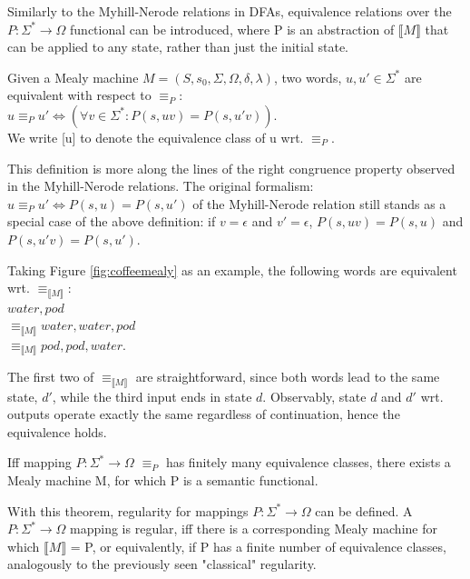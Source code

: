 Similarly to the Myhill-Nerode relations in DFAs, equivalence relations over the $P: \Sigma^*\to\Omega$ functional can be introduced, where P is an abstraction of  $\llbracket M\rrbracket$ that can be applied to any state, rather than just the initial state.

\begin{definition}
	Given a Mealy machine $M=(S,s_{0},\Sigma,\Omega,\delta,\lambda) $, two words, $u, u'\in\Sigma^*$ are equivalent with respect to $\equiv_P$:\\
	$u \equiv_P u' \iff (\forall v\in\Sigma^*:P(s, uv) = P(s, u'v))$.\\
	We write [u] to denote the equivalence class of u wrt. $\equiv_P$.
\end{definition}

This definition is more along the lines of the right congruence property observed in the Myhill-Nerode relations. The original formalism: $u \equiv_P u' \iff P(s, u) = P(s, u')$ of the Myhill-Nerode relation still stands as a special case of the above definition: if $v=\epsilon$ and $v'=\epsilon$, $P(s, uv) = P(s, u)$ and $P(s, u'v) = P(s, u')$.

\begin{example}
	Taking Figure \ref{fig:coffeemealy} as an example, the following words are equivalent wrt. $\equiv_{\llbracket M\rrbracket}$:\\
	\null\qquad\qquad\qquad\qquad\space $water, pod$\\
	\null\qquad\qquad$\equiv_{\llbracket M\rrbracket}$\qquad $water, water, pod$\\
	\null\qquad\qquad$\equiv_{\llbracket M\rrbracket}$\qquad $pod, pod, water$.
	
	The first two of $\equiv_{\llbracket M\rrbracket}$ are straightforward, since both words lead to the same state, $d'$, while the third input ends in state $d$. Observably, state $d$ and $d'$ wrt. outputs operate exactly the same regardless of continuation, hence the equivalence holds.
\end{example}

\begin{theorem}
	Iff mapping $P: \Sigma^*\to\Omega$ $\equiv_P$ has finitely many equivalence classes, there exists a Mealy machine M, for which P is a semantic functional.
\end{theorem}

With this theorem, regularity for mappings $P:\Sigma^*\to\Omega$ can be defined. A $P:\Sigma^*\to\Omega$ mapping is regular, iff there is a corresponding Mealy machine for which $\llbracket M\rrbracket$ = P, or equivalently, if P has a finite number of equivalence classes, analogously to the previously seen "classical" regularity.

